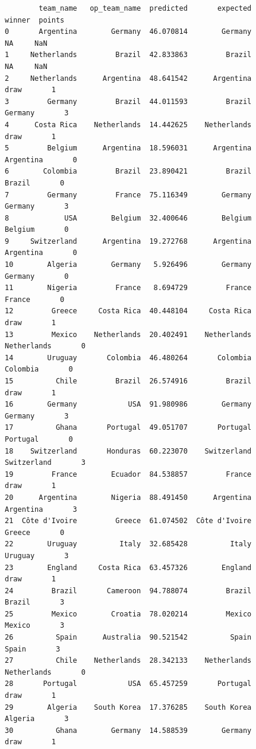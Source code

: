 \documentclass[12pt,fleqn]{article}\usepackage{../common}
\begin{document}
\begin{verbatim}
        team_name   op_team_name  predicted       expected         winner  points
0       Argentina        Germany  46.070814        Germany             NA     NaN
1     Netherlands         Brazil  42.833863         Brazil             NA     NaN
2     Netherlands      Argentina  48.641542      Argentina           draw       1
3         Germany         Brazil  44.011593         Brazil        Germany       3
4      Costa Rica    Netherlands  14.442625    Netherlands           draw       1
5         Belgium      Argentina  18.596031      Argentina      Argentina       0
6        Colombia         Brazil  23.890421         Brazil         Brazil       0
7         Germany         France  75.116349        Germany        Germany       3
8             USA        Belgium  32.400646        Belgium        Belgium       0
9     Switzerland      Argentina  19.272768      Argentina      Argentina       0
10        Algeria        Germany   5.926496        Germany        Germany       0
11        Nigeria         France   8.694729         France         France       0
12         Greece     Costa Rica  40.448104     Costa Rica           draw       1
13         Mexico    Netherlands  20.402491    Netherlands    Netherlands       0
14        Uruguay       Colombia  46.480264       Colombia       Colombia       0
15          Chile         Brazil  26.574916         Brazil           draw       1
16        Germany            USA  91.980986        Germany        Germany       3
17          Ghana       Portugal  49.051707       Portugal       Portugal       0
18    Switzerland       Honduras  60.223070    Switzerland    Switzerland       3
19         France        Ecuador  84.538857         France           draw       1
20      Argentina        Nigeria  88.491450      Argentina      Argentina       3
21  Côte d'Ivoire         Greece  61.074502  Côte d'Ivoire         Greece       0
22        Uruguay          Italy  32.685428          Italy        Uruguay       3
23        England     Costa Rica  63.457326        England           draw       1
24         Brazil       Cameroon  94.788074         Brazil         Brazil       3
25         Mexico        Croatia  78.020214         Mexico         Mexico       3
26          Spain      Australia  90.521542          Spain          Spain       3
27          Chile    Netherlands  28.342133    Netherlands    Netherlands       0
28       Portugal            USA  65.457259       Portugal           draw       1
29        Algeria    South Korea  17.376285    South Korea        Algeria       3
30          Ghana        Germany  14.588539        Germany           draw       1

\end{verbatim}
\end{document}
